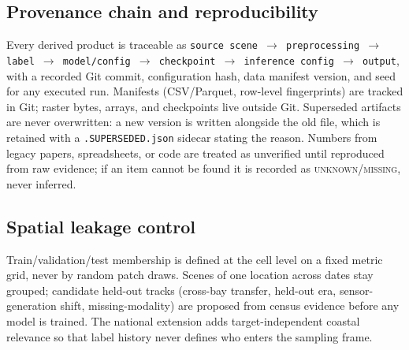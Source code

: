 \begin{figure}[t]\centering
{}
\label{fig:arch}
\end{figure}

\subsection{Provenance chain and reproducibility}
Every derived product is traceable as
\texttt{source\ scene\ $\rightarrow$ preprocessing $\rightarrow$ label
$\rightarrow$ model/config $\rightarrow$ checkpoint $\rightarrow$
inference\ config $\rightarrow$ output}, with a recorded Git commit,
configuration hash, data manifest version, and seed for any executed
run. Manifests (CSV/Parquet, row-level fingerprints) are tracked in
Git; raster bytes, arrays, and checkpoints live outside Git.
Superseded artifacts are never overwritten: a new version is written
alongside the old file, which is retained with a
\texttt{.SUPERSEDED.json} sidecar stating the reason. Numbers from
legacy papers, spreadsheets, or code are treated as unverified until
reproduced from raw evidence; if an item cannot be found it is recorded
as \textsc{unknown}/\textsc{missing}, never inferred.

\subsection{Spatial leakage control}
Train/validation/test membership is defined at the cell level on a
fixed metric grid, never by random patch draws. Scenes of one location
across dates stay grouped; candidate held-out tracks (cross-bay
transfer, held-out era, sensor-generation shift, missing-modality) are
proposed from census evidence before any model is trained. The
national extension adds target-independent coastal relevance so that
label history never defines who enters the sampling frame.
